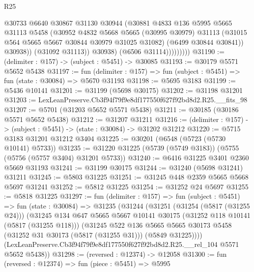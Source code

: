 \begin{lexlean}{R25}
\begin{coremodule}
                          @30733
                          @6640
                          @30867
                          @31130
                          @30944
                          (@30881
                            @4833
                            @136
                            @5995
                            @5665
                            @31113
                            @5458
                            (@30952
                              @4832
                              @5668
                              @5665
                              (@30995 @30979)
                              @31113
                              (@31015 @564 @5665 @5667 @30844 @30979 @31025 @31082)
                              (@6499 @30844 @30841))
                            @30938))
                        (@31092 @31113))
                      @30938)
                    (@6506 @31114)))))))))
@31190 := (delimiter : @157) -> (subject : @5451) -> @30085
@31193 := @30179 @5571 @5652 @5438
@31197 := fun (delimiter : @157) => fun (subject : @5451) => fun (state : @30084) => @5670 @31193
@31198 := @5695 @3183
@31199 := @5436 @10141
@31201 := @31199 (@5698 @30175)
@31202 := @31198 @31201
@31203 := LexLeanPreserve.Cb3f94f79f9e8df177550f627f92bd8d2.R25.__fits_98
@31207 := @5701 (@31203 @5652 @5571 @5438)
@31211 := @30185 (@30186 @5571 @5652 @5438)
@31212 := @31207 @31211
@31216 := (delimiter : @157) -> (subject : @5451) -> (state : @30084) -> @31202 @31212
@31220 := @5715 @3183 @31201 @31212 @3404
@31225 := @30201 (@6548 (@5723 (@5730 @10141) @5733))
@31235 := @31220 @31225 (@5739 (@5749 @3183)) (@5755 (@5756 (@5757 @3404) @31201 @5733))
@31240 := @6416 @31225 @3401 @2360 @5669 @31193
@31241 := @31199 @30175
@31244 := @31240 (@5698 @31241) @31211
@31245 := @5803 @31225
@31251 := @31245 @448 @2359 @5665 @5668 @5697 @31241
@31252 := @5812 @31225
@31254 := @31252 @24 @5697
@31255 := @5818 @31225
@31297 := fun (delimiter : @157) =>
  fun (subject : @5451) =>
  fun (state : @30084) =>
  @31235
    (@31244
      (@31251
        (@31254 (@5817 (@31255 @24)))
        (@31245
          @134
          @647
          @5665
          @5667
          @10141
          @30175
          (@31252 @118 @10141 (@5817 (@31255 @118)))
          (@31245
            @522
            @136
            @5665
            @5665
            @30173
            @5458
            (@31252 @31 @30173 (@5817 (@31255 @31)))
            (@5849 @31225))))
      (LexLeanPreserve.Cb3f94f79f9e8df177550f627f92bd8d2.R25.__rel_104 @5571 @5652 @5438))
@31298 := (reversed : @12374) -> @12058
@31300 := fun (reversed : @12374) => fun (piece : @5451) => @5995

\end{coremodule}
\end{lexlean}
